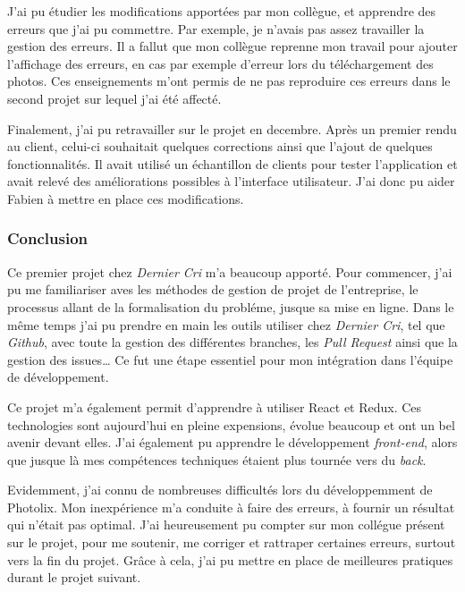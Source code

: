 \documentclass[12pt,a4paper]{article}
\begin{document}
  \bigskip

  J'ai pu étudier les modifications apportées par mon collègue, et
  apprendre des erreurs que j'ai pu commettre. Par exemple, je n'avais pas
  assez travailler la gestion des erreurs. Il a fallut que mon collègue
  reprenne mon travail pour ajouter l'affichage des erreurs, en cas par
  exemple d'erreur lors du téléchargement des photos. Ces enseignements
  m'ont permis de ne pas reproduire ces erreurs dans le second projet sur
  lequel j'ai été affecté.

  \bigskip

  Finalement, j'ai pu retravailler sur le projet en decembre. Après un
  premier rendu au client, celui-ci souhaitait quelques corrections ainsi
  que l'ajout de quelques fonctionnalités. Il avait utilisé un échantillon
  de clients pour tester l'application et avait relevé des améliorations
  possibles à l'interface utilisateur. J'ai donc pu aider Fabien à mettre
  en place ces modifications.

  \bigskip

  \subsubsection{Conclusion}\label{conclusion}

  \bigskip

  Ce premier projet chez \emph{Dernier Cri} m'a beaucoup apporté. Pour
  commencer, j'ai pu me familiariser aves les méthodes de gestion de
  projet de l'entreprise, le processus allant de la formalisation du
  probléme, jusque sa mise en ligne. Dans le même temps j'ai pu prendre en
  main les outils utiliser chez \emph{Dernier Cri}, tel que \emph{Github},
  avec toute la gestion des différentes branches, les \emph{Pull Request}
  ainsi que la gestion des issues\ldots{} Ce fut une étape essentiel pour
  mon intégration dans l'équipe de développement.

  \bigskip

  Ce projet m'a également permit d'apprendre à utiliser React et Redux.
  Ces technologies sont aujourd'hui en pleine expensions, évolue beaucoup
  et ont un bel avenir devant elles. J'ai également pu apprendre le
  développement \emph{front-end}, alors que jusque là mes compétences
  techniques étaient plus tournée vers du \emph{back}.

  \bigskip

  Evidemment, j'ai connu de nombreuses difficultés lors du développemment
  de Photolix. Mon inexpérience m'a conduite à faire des erreurs, à
  fournir un résultat qui n'était pas optimal. J'ai heureusement pu
  compter sur mon collégue présent sur le projet, pour me soutenir, me
  corriger et rattraper certaines erreurs, surtout vers la fin du projet.
  Grâce à cela, j'ai pu mettre en place de meilleures pratiques durant le
  projet suivant.
\end{document}
